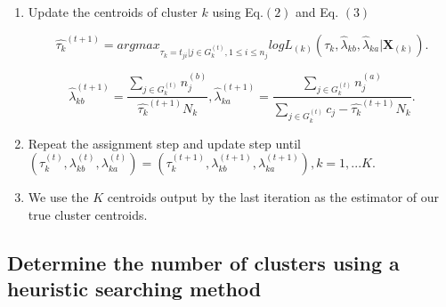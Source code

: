 \documentclass[12pt]{article}
\begin{document}
\begin{enumerate}[Step 1:]
\item Update the centroids of cluster $k$ using Eq.$(2)$ and Eq. $(3)$

\begin{equation}\label{eqn:tau_MLE}
\hat{\tau_k}^{(t+1)}= argmax_{\tau_k = t_{ji}|j \in G_k^{(t)}, 1\leq i \leq n_j}logL_{(k)}(\tau_k,\hat\lambda_{kb},\hat\lambda_{ka}|\pmb X_{(k)}).
\end{equation}

\begin{equation}\label{eqn:lam_MLE}
\hat{\lambda}_{kb}^{(t+1)}=\frac{\sum_{j \in G_k^{(t)}}n_j^{(b)}}{\hat{\tau_k}^{(t+1)}N_k},\hat{\lambda}_{ka}^{(t+1)}=\frac{\sum_{j \in G_k^{(t)}}n_j^{(a)}}{\sum_{j \in G_k^{(t)}}c_j- \hat{\tau_k}^{(t+1)}N_k}.
\end{equation}

\item Repeat the assignment step and update step until $(\tau_{k}^{(t)},\lambda_{kb}^{(t)},\lambda_{ka}^{(t)})=(\tau_{k}^{(t+1)},\lambda_{kb}^{(t+1)},\lambda_{ka}^{(t+1)}),k=1,...K$. 
\item We use the $K$ centroids output by the last iteration as the estimator of our true cluster centroids.
\end{enumerate}



\subsection{Determine the number of clusters using a heuristic searching method}
\end{document}
